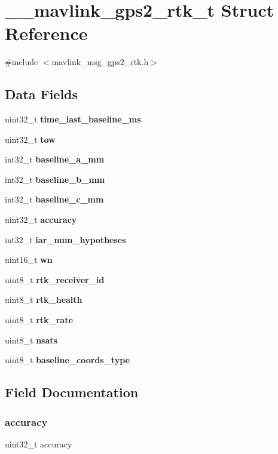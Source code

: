 \section{\+\_\+\+\_\+mavlink\+\_\+gps2\+\_\+rtk\+\_\+t Struct Reference}
\label{struct____mavlink__gps2__rtk__t}


{\ttfamily \#include $<$mavlink\+\_\+msg\+\_\+gps2\+\_\+rtk.\+h$>$}

\subsection*{Data Fields}
\begin{DoxyCompactItemize}
\item 
uint32\+\_\+t \textbf{ time\+\_\+last\+\_\+baseline\+\_\+ms}
\item 
uint32\+\_\+t \textbf{ tow}
\item 
int32\+\_\+t \textbf{ baseline\+\_\+a\+\_\+mm}
\item 
int32\+\_\+t \textbf{ baseline\+\_\+b\+\_\+mm}
\item 
int32\+\_\+t \textbf{ baseline\+\_\+c\+\_\+mm}
\item 
uint32\+\_\+t \textbf{ accuracy}
\item 
int32\+\_\+t \textbf{ iar\+\_\+num\+\_\+hypotheses}
\item 
uint16\+\_\+t \textbf{ wn}
\item 
uint8\+\_\+t \textbf{ rtk\+\_\+receiver\+\_\+id}
\item 
uint8\+\_\+t \textbf{ rtk\+\_\+health}
\item 
uint8\+\_\+t \textbf{ rtk\+\_\+rate}
\item 
uint8\+\_\+t \textbf{ nsats}
\item 
uint8\+\_\+t \textbf{ baseline\+\_\+coords\+\_\+type}
\end{DoxyCompactItemize}


\subsection{Field Documentation}
\mbox{\label{struct____mavlink__gps2__rtk__t_a28f507097f56f5f24ed62f9bd1416cc0}} 
\subsubsection{accuracy}
{\footnotesize\ttfamily uint32\+\_\+t accuracy}

